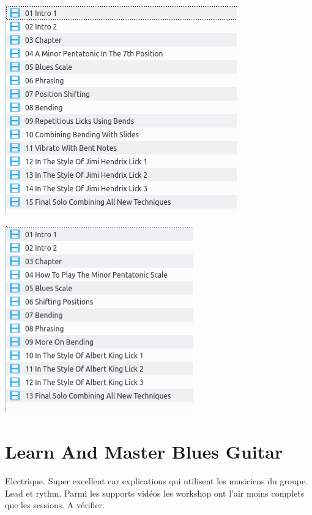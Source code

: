 \documentclass[a4paper]{book}
\begin{document}
\clearpage

\begin{center}
\includegraphics[width=10.026cm,height=9.047cm]{lebluessupportsmethodes-img122.png}
\end{center}





\begin{center}
\includegraphics[width=8.147cm,height=8.068cm]{lebluessupportsmethodes-img123.png}
\end{center}



\clearpage


\section[Learn And Master Blues Guitar]{Learn And Master Blues
Guitar}
\hypertarget{RefHeadingToc174973218262}{}
Electrique. Super excellent car explications qui utilisent les musiciens du groupe. Lead et rythm.
Parmi les supports vidéos les workshop ont l'air moins complets que les sessions. A vérifier.
\end{document}
